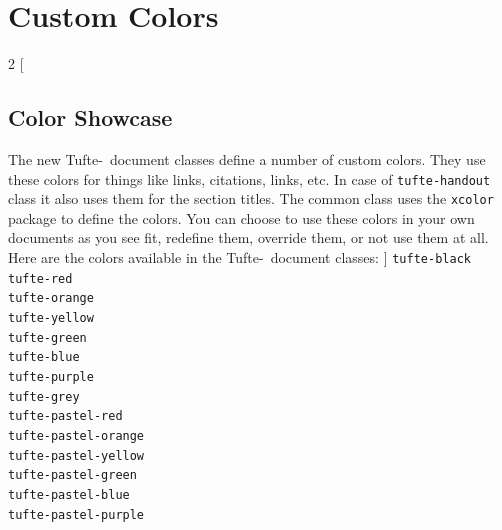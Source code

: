 \documentclass[a4paper]{tufte-handout}
\newcommand{\TL}{Tufte-\hologo{LaTeX}\xspace}
\newcommand{\hlorange}[1]{\textcolor{tufte-orange}{#1}}
\newcommand{\docpkg}[1]{\hlorange{\texttt{#1}}}
\newcommand{\doccls}[1]{\texttt{#1}}
\begin{document}
\section{Custom Colors}\label{sec:custom-colors}
\begin{multicols}{2} [
  \subsection{Color Showcase}
    The new \TL\ document classes define a number of custom colors.
    They use these colors for things like links, citations, links, etc.
    In case of \doccls{tufte-handout} class it also uses them for the section titles.
    The common class uses the \docpkg{xcolor} package to define the colors.
    You can choose to use these colors in your own documents as you see fit, redefine them, override them, or not use them at all.
    Here are the colors available in the \TL\ document classes:
]
\noindent
{}
\Verb|tufte-black| \\
\Verb|tufte-red| \\
\Verb|tufte-orange| \\
\Verb|tufte-yellow| \\
\Verb|tufte-green| \\
\Verb|tufte-blue| \\
\Verb|tufte-purple| \\
\Verb|tufte-grey| \\
\Verb|tufte-pastel-red| \\
\Verb|tufte-pastel-orange| \\
\Verb|tufte-pastel-yellow| \\
\Verb|tufte-pastel-green| \\
\Verb|tufte-pastel-blue| \\
\Verb|tufte-pastel-purple|
\end{multicols}
\end{document}
